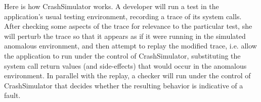 


Here is how CrashSimulator works.  A developer will run a
test in the application's usual testing environment, recording a
trace of its system calls. After checking some aspects of the trace for
relevance to the particular test, she will perturb the trace so that it appears
as if it were running in the simulated anomalous environment, and then
attempt to replay the modified trace, i.e. allow the application to
run under the control of CrashSimulator, substituting the system call
return values (and side-effects) that would occur in the anomalous
environment. In parallel with the replay, a checker will run under the
control of CrashSimulator that decides whether the resulting behavior
is indicative of a fault.

